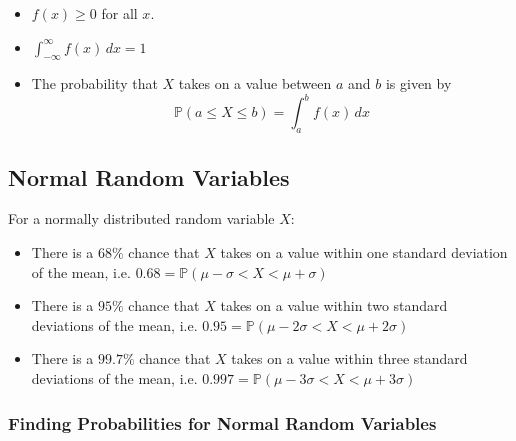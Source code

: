 \documentclass[12pt letter]{report}
\begin{document}
\begin{itemize}
	\item $f \left( x \right) \geq 0$ for all $x$.
	\item $\int_{-\infty}^{\infty} f \left( x \right) \, dx = 1$
	\item The probability that $X$ takes on a value between $a$ and $b$ is given by
	      \[
		      \mathbb{P} \left( a \leq X \leq b \right) = \int_{a}^{b} f \left( x \right) \, dx
	      \]
\end{itemize}


\subsection{Normal Random Variables}


For a normally distributed random variable $X$:

\begin{itemize}
	\item There is a $68\%$ chance that $X$ takes on a value within one standard deviation of the mean, i.e. $0.68 = \mathbb{P}
		      \left( \mu - \sigma < X < \mu + \sigma  \right) $
	\item There is a $95\%$ chance that $X$ takes on a value within two standard deviations of the mean, i.e. $0.95 = \mathbb{P}
		      \left( \mu - 2 \sigma < X < \mu + 2 \sigma  \right) $
	\item There is a $99.7\%$ chance that $X$ takes on a value within three standard deviations of the mean, i.e. $0.997 = \mathbb{P}
		      \left( \mu - 3 \sigma < X < \mu + 3 \sigma  \right) $
\end{itemize}

\subsubsection{Finding Probabilities for Normal Random Variables}
\end{document}

